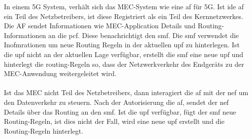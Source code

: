 \documentclass[runningheads]{llncs}
\numberwithin{figure}{section}
\begin{document}
In einem 5G System, verhält sich das MEC-System wie eine \acrfull{af} für 5G. Ist ide \acrshort{af} ein Teil des Netzbetreibers, ist diese 
Registriert als ein Teil des Kernnetzwerkes. Die AF sendet Informationen wie MEC-Application Details und Routing-Informationen 
an die \acrshort{pcf}. Diese benachrichtigt den \acrshort{smf}. Die \acrlong{smf} verwendet die Inofmrationen um neue Routing Regeln in der
aktuellen \acrshort{upf} zu hinterlegen. Ist die \acrshort{upf} nicht an der aktuellen Lage verfügbar, erstellt die \acrshort{smf} eine 
neue \acrshort{upf} und hinterlegt die routing-Regeln so, dass der Netzwerkverkehr des Endgeräts zu der MEC-Anwendung weitergeleitet wird.
\\
\\
Ist das MEC nicht Teil des Netzbetreibers, dann interagiert die \acrshort{af} mit der \acrshort{nef} um den Datenverkehr zu steuern.
Nach der Autorisierung die \acrshort{af}, sendet der \acrshort{nef} Details über das Routing an den \acrshort{smf}. Ist die \acrshort{upf}
verfügbar, fügt der \acrshort{smf} neue Routing-Regeln, ist dies nicht der Fall, wird eine neue \acrshort{upf} erstellt und die Routing-Regeln
hinterlegt.
\end{document}
